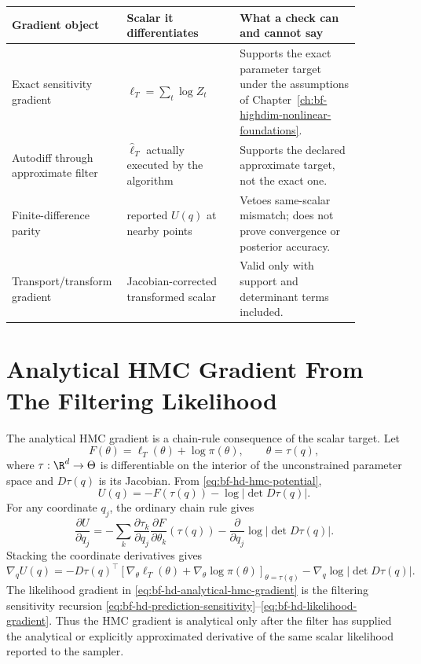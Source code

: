 \small
\begin{longtable}{@{}p{0.24\linewidth}p{0.31\linewidth}p{0.33\linewidth}@{}}
\toprule
Gradient object & Scalar it differentiates & What a check can and cannot say \\
\midrule
\endhead
Exact sensitivity gradient & \(\ell_T=\sum_t\log Z_t\) & Supports the exact
parameter target under the assumptions of
Chapter~\ref{ch:bf-highdim-nonlinear-foundations}. \\
Autodiff through approximate filter & \(\widehat\ell_T\) actually executed by
the algorithm & Supports the declared approximate target, not the exact one. \\
Finite-difference parity & reported \(U(q)\) at nearby points & Vetoes
same-scalar mismatch; does not prove convergence or posterior accuracy. \\
Transport/transform gradient & Jacobian-corrected transformed scalar & Valid
only with support and determinant terms included. \\
\bottomrule
\end{longtable}
\normalsize

\section{Analytical HMC Gradient From The Filtering Likelihood}
\label{sec:bf-hd-analytical-hmc-gradient}

The analytical HMC gradient is a chain-rule consequence of the scalar target.
Let
\[
  F(\theta)=\ell_T(\theta)+\log\pi(\theta),
  \qquad \theta=\tau(q),
\]
where \(\tau:\R^d\to\Theta\) is differentiable on the interior of the
unconstrained parameter space and \(D\tau(q)\) is its Jacobian.  From
\eqref{eq:bf-hd-hmc-potential},
\[
  U(q)=-F(\tau(q))-\log|\det D\tau(q)|.
\]
For any coordinate \(q_j\), the ordinary chain rule gives
\[
  \frac{\partial U}{\partial q_j}
  =
  -\sum_k
  \frac{\partial \tau_k}{\partial q_j}
  \frac{\partial F}{\partial \theta_k}(\tau(q))
  -
  \frac{\partial}{\partial q_j}\log|\det D\tau(q)|.
\]
Stacking the coordinate derivatives gives
\begin{equation}
  \nabla_q U(q)
  =
  -D\tau(q)^\top
  \left[
  \nabla_\theta\ell_T(\theta)+\nabla_\theta\log\pi(\theta)
  \right]_{\theta=\tau(q)}
  -
  \nabla_q\log|\det D\tau(q)|.
  \label{eq:bf-hd-analytical-hmc-gradient}
\end{equation}
The likelihood gradient in \eqref{eq:bf-hd-analytical-hmc-gradient} is the
filtering sensitivity recursion
\eqref{eq:bf-hd-prediction-sensitivity}--\eqref{eq:bf-hd-likelihood-gradient}.
Thus the HMC gradient is analytical only after the filter has supplied the
analytical or explicitly approximated derivative of the same scalar likelihood
reported to the sampler.

